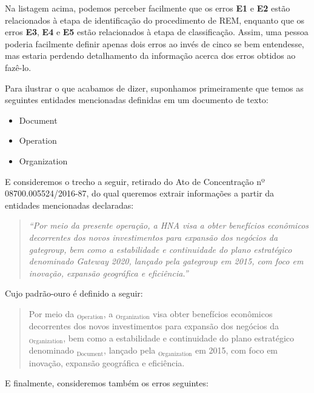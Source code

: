 \documentclass[11pt]{report}
\newcommand{\quotes}[1]{``#1''}
\begin{document}
Na listagem acima, podemos perceber facilmente que os erros \textbf{E1} e \textbf{E2} estão relacionados à etapa de identificação do procedimento de REM, enquanto que
os erros \textbf{E3}, \textbf{E4} e \textbf{E5} estão relacionados à etapa de classificação. Assim, uma pessoa poderia facilmente definir apenas dois erros ao invés
de cinco se bem entendesse, mas estaria perdendo detalhamento da informação acerca dos erros obtidos ao fazê-lo.

Para ilustrar o que acabamos de dizer, suponhamos primeiramente que temos as seguintes entidades mencionadas definidas em um documento de texto:

\begin{itemize}
  \item Document
  \item Operation
  \item Organization
\end{itemize}

E consideremos o trecho a seguir, retirado do Ato de Concentração nº 08700.005524/2016-87, do qual queremos extrair informações a partir da entidades mencionadas
declaradas:

\begin{quote}
  \textit{\quotes{Por meio da presente operação, a HNA visa a obter benefícios econômicos decorrentes dos novos investimentos para expansão dos negócios da gategroup,
  bem como a  estabilidade e  continuidade do plano estratégico denominado Gateway 2020, lançado pela gategroup em 2015, com foco em inovação, expansão geográfica e eficiência.}}
\end{quote}

Cujo padrão-ouro é definido a seguir:

\begin{quote}
  \begin{varwidth}{0.89\textwidth}
  Por meio da $_{\text{Operation}}$, a $_{\text{Organization}}$ visa obter benefícios econômicos decorrentes dos novos investimentos para
  expansão dos negócios da $_{\text{Organization}}$, bem como a
  estabilidade e  continuidade do plano estratégico denominado $_{\text{Document}}$, lançado pela $_{\text{Organization}}$ em 2015,
  com foco em inovação, expansão geográfica e eficiência.
  \end{varwidth}
\end{quote}

E finalmente, consideremos também os erros seguintes:
\end{document}
